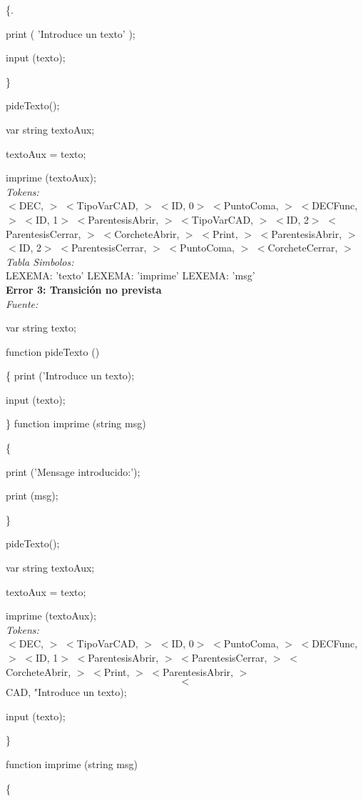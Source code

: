 \documentclass[a4paper, 12pt]{article}
\begin{document}
\{. 

	print ( 'Introduce un texto' ); 
	
	input (texto); 
	
\} 

 pideTexto(); 
 
var string textoAux;

textoAux = texto;

imprime (textoAux);\medskip\\
\emph{Tokens:}\\
 $<$DEC, $>$ 
 $<$TipoVarCAD, $>$ 
 $<$ID, 0$>$ 
 $<$PuntoComa, $>$
 $<$DECFunc, $>$  
 $<$ID, 1$>$ 
 $<$ParentesisAbrir, $>$ 
 $<$TipoVarCAD, $>$
 $<$ID, 2$>$ 
 $<$ParentesisCerrar, $>$ 
 $<$CorcheteAbrir, $>$ 
 $<$Print, $>$ 
 $<$ParentesisAbrir, $>$ 
 $<$ID, 2$>$ 
 $<$ParentesisCerrar, $>$ 
 $<$PuntoComa, $>$ 
 $<$CorcheteCerrar, $>$\medskip\\
\emph{Tabla Simbolos:}\\
  LEXEMA: 'texto'
  LEXEMA: 'imprime'
  LEXEMA: 'msg'\bigskip \\
\textbf{Error 3: Transición no prevista}\\
\emph{Fuente:}

var string texto;

function pideTexto ()

\{
	print ('Introduce un texto);
	
	input (texto);
	
\}
function imprime (string msg)

\{

	print ('Mensage introducido:');
	
	print (msg);
	
\}

pideTexto();

var string textoAux;

textoAux = texto;

imprime (textoAux);\medskip\\
\emph{Tokens:}\\
 $<$DEC, $>$ 
 $<$TipoVarCAD, $>$ 
 $<$ID, 0$>$ 
 $<$PuntoComa, $>$ 
 $<$DECFunc, $>$ 
 $<$ID, 1$>$ 
 $<$ParentesisAbrir, $>$ 
 $<$ParentesisCerrar, $>$ 
 $<$CorcheteAbrir, $>$ 
 $<$Print, $>$ 
 $<$ParentesisAbrir, $>$ 
$$<$$CAD, "\textnormal{Introduce un texto);} 
 
	input (texto);
	
\} 

\textnormal{function imprime (string msg)}

\{ 
\end{document}
